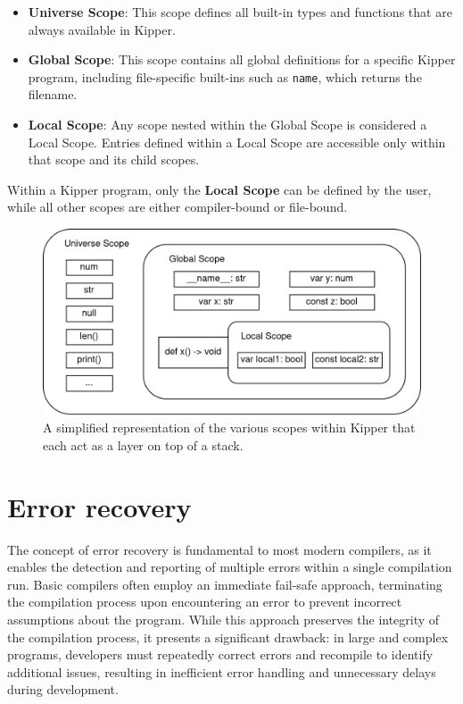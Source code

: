 \begin{itemize}
	\item \textbf{Universe Scope}: This scope defines all built-in types and functions that are always available in Kipper.
	\item \textbf{Global Scope}: This scope contains all global definitions for a specific Kipper program, including file-specific built-ins such as \lstinline|name|, which returns the filename.
	\item \textbf{Local Scope}: Any scope nested within the Global Scope is considered a Local Scope. Entries defined within a Local Scope are accessible only within that scope and its child scopes.
\end{itemize}

Within a Kipper program, only the \textbf{Local Scope} can be defined by the user, while all other scopes are either compiler-bound or file-bound.

 \begin{figure}[h!]
 	\centering
 	\includegraphics[scale=1]{./pics/Kipper-Scopes.drawio}
 	\caption{A simplified representation of the various scopes within Kipper that each act as a layer on top of a stack.}
 	\label{fig:implementation:kipper-scopes}
 \end{figure}

\section{Error recovery}
\label{sec:error-recovery}

The concept of error recovery is fundamental to most modern compilers, as it enables the detection and reporting of multiple errors within a single compilation run. Basic compilers often employ an immediate fail-safe approach, terminating the compilation process upon encountering an error to prevent incorrect assumptions about the program. While this approach preserves the integrity of the compilation process, it presents a significant drawback: in large and complex programs, developers must repeatedly correct errors and recompile to identify additional issues, resulting in inefficient error handling and unnecessary delays during development.

